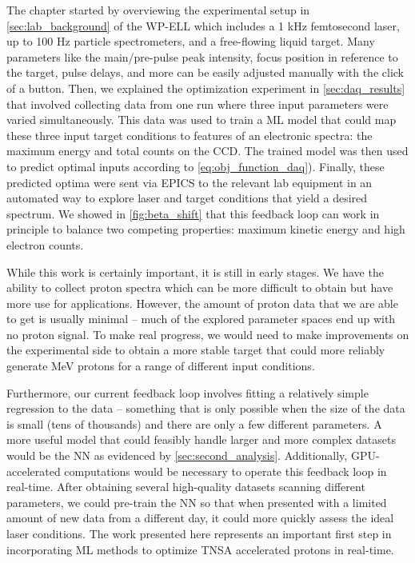 The chapter started by overviewing the experimental setup in \autoref{sec:lab_background} of the \gls{WP-ELL} which includes a 1 kHz femtosecond laser, up to 100 Hz particle spectrometers, and a free-flowing liquid target. Many parameters like the main/pre-pulse peak intensity, focus position in reference to the target, pulse delays, and more can be easily adjusted manually with the click of a button. Then, we explained the optimization experiment in \autoref{sec:daq_results} that involved collecting data from one run where three input parameters were varied simultaneously. This data was used to train a \gls{ML} model that could map these three input target conditions to features of an electronic spectra: the maximum energy and total counts on the \gls{CCD}. The trained model was then used to predict optimal inputs according to \autoref{eq:obj_function_daq}). Finally, these predicted optima were sent via \gls{EPICS} to the relevant lab equipment in an automated way to explore laser and target conditions that yield a desired spectrum. We showed in \autoref{fig:beta_shift} that this feedback loop can work in principle to balance two competing properties: maximum kinetic energy and high electron counts. 

While this work is certainly important, it is still in early stages. We have the ability to collect proton spectra which can be more difficult to obtain but have more use for applications. However, the amount of proton data that we are able to get is usually minimal -- much of the explored parameter spaces end up with no proton signal. To make real progress, we would need to make improvements on the experimental side to obtain a more stable target that could more reliably generate MeV protons for a range of different input conditions.

Furthermore, our current feedback loop involves fitting a relatively simple regression to the data -- something that is only possible when the size of the data is small (tens of thousands) and there are only a few different parameters. A more useful model that could feasibly handle larger and more complex datasets would be the \gls{NN} as evidenced by \autoref{sec:second_analysis}. Additionally, \gls{GPU}-accelerated computations would be necessary to operate this feedback loop in real-time. After obtaining several high-quality datasets scanning different parameters, we could pre-train the \gls{NN} so that when presented with a limited amount of new data from a different day, it could more quickly assess the ideal laser conditions. The work presented here represents an important first step in incorporating \gls{ML} methods to optimize \gls{TNSA} accelerated protons in real-time. 